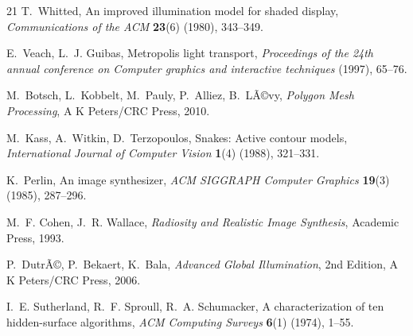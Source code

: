 ﻿\documentclass[a4paper,12pt]{article}
\theoremstyle{definition}
\begin{document}
\begin{thebibliography}{21}
	T.~Whitted,
	An improved illumination model for shaded display,
	\emph{Communications of the ACM} \textbf{23}(6) (1980), 343--349.
	
	E.~Veach, L.~J. Guibas,
	Metropolis light transport,
	\emph{Proceedings of the 24th annual conference on Computer graphics and interactive techniques} (1997), 65--76.
	
	M.~Botsch, L.~Kobbelt, M.~Pauly, P.~Alliez, B.~LÃ©vy,
	\emph{Polygon Mesh Processing},
	A K Peters/CRC Press, 2010.
	
	M.~Kass, A.~Witkin, D.~Terzopoulos,
	Snakes: Active contour models,
	\emph{International Journal of Computer Vision} \textbf{1}(4) (1988), 321--331.
	
	K.~Perlin,
	An image synthesizer,
	\emph{ACM SIGGRAPH Computer Graphics} \textbf{19}(3) (1985), 287--296.
	
	M.~F. Cohen, J.~R. Wallace,
	\emph{Radiosity and Realistic Image Synthesis},
	Academic Press, 1993.
	
	P.~DutrÃ©, P.~Bekaert, K.~Bala,
	\emph{Advanced Global Illumination},
	2nd Edition, A K Peters/CRC Press, 2006.
	
	I.~E. Sutherland, R.~F. Sproull, R.~A. Schumacker,
	A characterization of ten hidden-surface algorithms,
	\emph{ACM Computing Surveys} \textbf{6}(1) (1974), 1--55.
	
\end{thebibliography}
\end{document}
